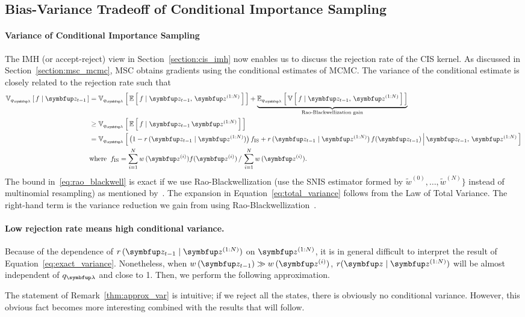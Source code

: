 \subsection{Bias-Variance Tradeoff of Conditional Importance Sampling}\label{section:bias_variance}
\paragraph{Variance of Conditional Importance Sampling}
The IMH (or accept-reject) view in Section~\ref{section:cis_imh} now enables us to discuss the rejection rate of the CIS kernel.
As discussed in Section~\ref{section:msc_mcmc}, MSC obtains gradients using the conditional estimates of MCMC.
The variance of the conditional estimate is closely related to the rejection rate such that
\begin{align}
  \Vsub{q_{\vlambda}}{f \mid \vz_{t-1}} &= \Vsub{q_{\vlambda}}{ \E{ f \mid \vz_{t-1},\,\vz^{(1:N)} } } + \underbrace{\Esub{q_{\vlambda}}{ \V{ f \mid \vz_{t-1},\,\vz^{(1:N)} } }}_{\text{Rao-Blackwellization gain}} \label{eq:total_variance} \\
  &\geq \Vsub{q_{\vlambda}}{ \E{ f \mid \vz_{t-1}\,\vz^{(1:N)} } } \label{eq:rao_blackwell}\\
  &= \Vsub{q_{\vlambda}}{ \big(1 - r\,(\vz_{t-1}\mid\vz^{(1:N)})\big)\, f_{\mathrm{IS}}
    + r\,(\vz_{t-1}\mid\vz^{(1:N)})\,f(\vz_{t-1}) \,\middle\vert\, \vz_{t-1},\, \vz^{(1:N)} } \label{eq:exact_variance} \\
  &\text{where}\;\; f_{\mathrm{IS}} = {\sum_{i=1}^N w\,(\vz^{(i)}) f(\vz^{(i)})\,/\,\sum_{i=1}^N w\,(\vz^{(i)})}. \nonumber 
\end{align}
%
The bound in~\eqref{eq:rao_blackwell} is exact if we use Rao-Blackwellization (use the SNIS estimator formed by \(\widetilde{w}^{(0)}, \ldots, \widetilde{w}^{(N)}\}\) instead of multinomial resampling) as mentioned by~\citet{NEURIPS2020_b2070693}.
The expansion in Equation~\eqref{eq:total_variance} follows from the Law of Total Variance.
The right-hand term is the variance reduction we gain from using Rao-Blackwellization~\citep{bernton_locally_2015}.

\paragraph{Low rejection rate means high conditional variance.}
Because of the dependence of \(r\,(\vz_{t-1}\mid\vz^{(1:N)})\) on \(\vz^{(1:N)}\), it is in general difficult to interpret the result of Equation~\eqref{eq:exact_variance}.
Nonetheless, when \(w\,(\vz_{t-1}) \gg w\,(\vz^{(i)})\), \(r(\vz\mid\vz^{(1:N)})\) will be almost independent of \(q_{\vlambda}\) and close to 1.
Then, we perform the following approximation.
%

%
The statement of Remark~\ref{thm:approx_var} is intuitive; if we reject all the states, there is obviously no conditional variance.
However, this obvious fact becomes more interesting combined with the results that will follow.

